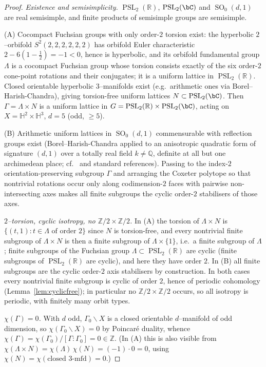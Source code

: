 \documentclass[12pt]{article}
\newcommand{\bR}{\mathbb{R}}
\newcommand{\bQ}{\mathbb{Q}}
\newcommand{\bZ}{\mathbb{Z}}
\newcommand{\bH}{\mathbb{H}}
\DeclareMathOperator{\SO}{SO}
\DeclareMathOperator{\PSL}{PSL}
\theoremstyle{definition}
\begin{document}
\begin{proof}
\emph{Existence and semisimplicity.}  $\PSL_2(\bR)$, $\PSL_2(\bC)$ and
$\SO_0(d,1)$ are real semisimple, and finite products of semisimple groups are
semisimple.

(A) Cocompact Fuchsian groups with only order-$2$ torsion exist: the hyperbolic
$2$--orbifold $S^2(2,2,2,2,2,2)$ has orbifold Euler characteristic
$2-6(1-\tfrac12)=-1<0$, hence is hyperbolic, and its orbifold fundamental group
$\Lambda$ is a cocompact Fuchsian group whose torsion consists exactly of the six
order-$2$ cone-point rotations and their conjugates; it is a uniform lattice in
$\PSL_2(\bR)$.  Closed orientable hyperbolic $3$--manifolds exist (e.g.\
arithmetic ones via Borel--Harish-Chandra), giving torsion-free uniform lattices
$N\subset\PSL_2(\bC)$.  Then $\Gamma=\Lambda\times N$ is a uniform lattice in
$G=\PSL_2(\bR)\times\PSL_2(\bC)$, acting on $X=\bH^2\times\bH^3$, $d=5$ (odd,
$\ge5$).

(B) Arithmetic uniform lattices in $\SO_0(d,1)$ commensurable with reflection
groups exist (Borel--Harish-Chandra applied to an anisotropic quadratic form of
signature $(d,1)$ over a totally real field $k\neq\bQ$, definite at all but one
archimedean place; cf.\ \cite[\S2]{Lueck} and standard references).  Passing to
the index-$2$ orientation-preserving subgroup $\Gamma$ and arranging the Coxeter
polytope so that nontrivial rotations occur only along codimension-$2$ faces with
pairwise non-intersecting axes makes all finite subgroups the cyclic order-$2$
stabilisers of those axes.

\emph{$2$--torsion, cyclic isotropy, no $\bZ/2\times\bZ/2$.}  In (A) the torsion
of $\Lambda\times N$ is $\{(t,1):t\in\Lambda\text{ of order }2\}$ since $N$ is
torsion-free, and every nontrivial finite subgroup of $\Lambda\times N$ is then a
finite subgroup of $\Lambda\times\{1\}$, i.e.\ a finite subgroup of $\Lambda$;
finite subgroups of the Fuchsian group $\Lambda\subset\PSL_2(\bR)$ are cyclic
(finite subgroups of $\PSL_2(\bR)$ are cyclic), and here they have order $2$.  In
(B) all finite subgroups are the cyclic order-$2$ axis stabilisers by
construction.  In both cases every nontrivial finite subgroup is cyclic of order
$2$, hence of periodic cohomology (Lemma~\ref{lem:cyclicfree}); in particular no
$\bZ/2\times\bZ/2$ occurs, so all isotropy is periodic, with finitely many orbit
types.

\emph{$\chi(\Gamma)=0$.}  With $d$ odd, $\Gamma_0\backslash X$ is a closed
orientable $d$--manifold of odd dimension, so $\chi(\Gamma_0\backslash X)=0$ by
Poincar\'e duality, whence
$\chi(\Gamma)=\chi(\Gamma_0)/[\Gamma:\Gamma_0]=0\in\bZ$.  (In (A) this is also
visible from $\chi(\Lambda\times N)=\chi(\Lambda)\,\chi(N)=(-1)\cdot0=0$, using
$\chi(N)=\chi(\text{closed }3\text{-mfd})=0$.)


\end{proof}
\end{document}
